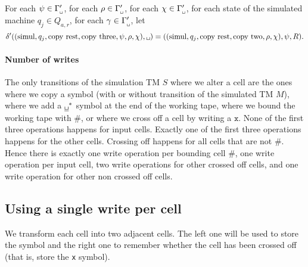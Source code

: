 \documentclass{article}
\newcommand{\obullet}[1]{\ensuremath{#1^*}}
\newcommand{\0}{\texttt{\textvisiblespace}}
\newcommand{\°}{\obullet{\0}}
\newcommand{\BB}{\obullet{\underline{\0}}}
\newcommand{\X}{\texttt{x}}
\newcommand{\e}{\texttt{\#}}
\newcommand{\TM}{TM}
\newcommand{\gpwb}{\Gamma'_{\0{}}}
\newcommand{\qwar}{Q_{a,r}}
\begin{document}
For each $\psi \in \gpwb$,
for each $\rho \in \gpwb$,
for each $\chi \in \gpwb$,
for each state of the simulated machine $q_j \in \qwar$,
for each $\gamma \in\gpwb$,
let $$\delta'((\text{simul}, q_j, \text{copy rest}, \text{copy three}, \psi, \rho, \chi), \0{})
= ((\text{simul}, q_j, \text{copy rest}, \text{copy two}, \rho, \chi), \psi, R).$$

\paragraph{Number of writes}
The only transitions of the simulation \TM{} $S$ where we alter a cell are the
ones where we
copy a symbol (with or without transition of the simulated \TM{} $M$), where we add a
$\BB$ symbol at the end of the working tape, where we bound the working tape
with $\e$, or where we cross off a cell by writing a $\X$.
None of the first three operations happens for input cells.
Exactly one of the first three operations happens for the other
cells.
Crossing off happens for all cells that are not $\e$. Hence there is exactly
one write operation per bounding cell $\e$,
one write operation per input cell,
two write operations for other crossed off cells,
and one write operation for other non crossed off cells.

\subsection{Using a single write per cell}

We transform each cell into two adjacent cells. The left one will be used to
store the symbol and the right one to remember whether the cell has been
crossed off (that is, store the \X{} symbol).
\end{document}
